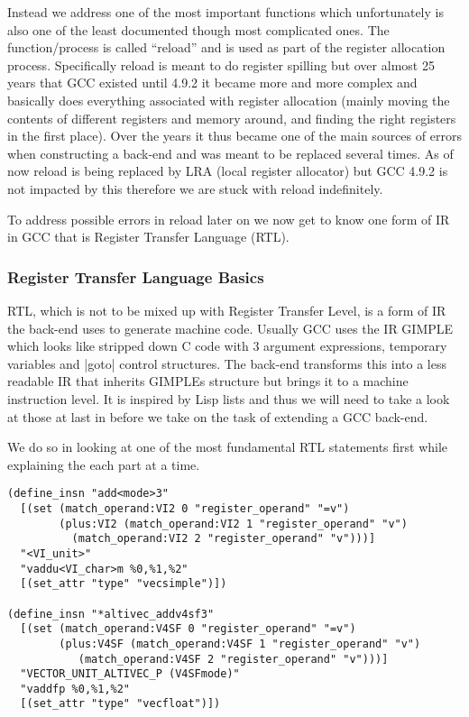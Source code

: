 Instead we address one of the most important functions which unfortunately is also one of the least documented though most complicated ones.
The function/process is called ``reload'' and is used as part of the register allocation process. 
Specifically reload is meant to do register spilling but over almost 25 years that GCC existed until 4.9.2 it became more and more complex and basically does everything associated with register allocation (mainly moving the contents of different registers and memory around, and finding the right registers in the first place).
Over the years it thus became one of the main sources of errors when constructing a back-end and was meant to be replaced several times.
As of now reload is being replaced by LRA (local register allocator) but GCC 4.9.2 is not impacted by this therefore we are stuck with reload indefinitely.

To address possible errors in reload later on we now get to know one form of IR in GCC that is Register Transfer Language (RTL).

\subsubsection{Register Transfer Language Basics}
RTL, which is not to be mixed up with Register Transfer Level, is a form of IR the back-end uses to generate machine code.
Usually GCC uses the IR GIMPLE which looks like stripped down C code with 3 argument expressions, temporary variables and |goto| control structures.
The back-end transforms this into a less readable IR that inherits GIMPLEs structure but brings it to a machine instruction level.
It is inspired by Lisp lists and thus we will need to take a look at those at last in before we take on the task of extending a GCC back-end.

We do so in looking at one of the most fundamental RTL statements first while explaining the each part at a time.

\begin{lstlisting}
(define_insn "add<mode>3"
  [(set (match_operand:VI2 0 "register_operand" "=v")
        (plus:VI2 (match_operand:VI2 1 "register_operand" "v")
		  (match_operand:VI2 2 "register_operand" "v")))]
  "<VI_unit>"
  "vaddu<VI_char>m %0,%1,%2"
  [(set_attr "type" "vecsimple")])

(define_insn "*altivec_addv4sf3"
  [(set (match_operand:V4SF 0 "register_operand" "=v")
        (plus:V4SF (match_operand:V4SF 1 "register_operand" "v")
		   (match_operand:V4SF 2 "register_operand" "v")))]
  "VECTOR_UNIT_ALTIVEC_P (V4SFmode)"
  "vaddfp %0,%1,%2"
  [(set_attr "type" "vecfloat")])
\end{lstlisting}

